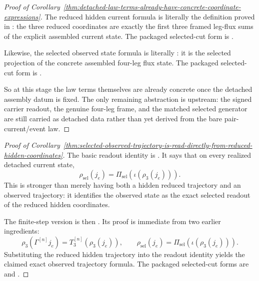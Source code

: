 \begin{proof}[Proof of Corollary~\ref{thm:detached-law-terms-already-have-concrete-coordinate-expressions}]
\label{proof:thm:detached-law-terms-already-have-concrete-coordinate-expressions}
The reduced hidden current formula is literally the definition proved in
: the three reduced
coordinates are exactly the first three framed leg-flux sums of the explicit
assembled current state. The packaged selected-cut form is
.

Likewise, the selected observed state formula is literally
: it is the selected
projection of the concrete assembled four-leg flux state. The packaged
selected-cut form is
.

So at this stage the law terms themselves are already concrete once the
detached assembly datum is fixed. The only remaining abstraction is upstream:
the signed carrier readout, the genuine four-leg frame, and the matched
selected generator are still carried as detached data rather than yet derived
from the bare pair-current/event law.
\end{proof}

\begin{proof}[Proof of Corollary~\ref{thm:selected-observed-trajectory-is-read-directly-from-reduced-hidden-coordinates}]
\label{proof:thm:selected-observed-trajectory-is-read-directly-from-reduced-hidden-coordinates}
The basic readout identity is
. It says
that on every realized detached current state,
\[
\rho_{\mathrm{sel}}(j_e)
=
\Pi_{\mathrm{sel}}(\iota(\rho_3(j_e))).
\]
This is stronger than merely having both a hidden reduced trajectory and an
observed trajectory: it identifies the observed state as the exact selected
readout of the reduced hidden coordinates.

The finite-step version is then
. Its
proof is immediate from two earlier ingredients:
\[
\rho_3(\Gamma^{[n]} j_e)=T_3^{[n]}(\rho_3(j_e)),
\qquad
\rho_{\mathrm{sel}}(j_e)=\Pi_{\mathrm{sel}}(\iota(\rho_3(j_e))).
\]
Substituting the reduced hidden trajectory into the readout identity yields the
claimed exact observed trajectory formula. The packaged selected-cut forms are
and
.
\end{proof}

